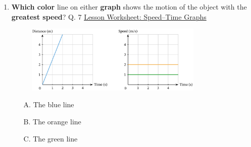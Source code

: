 \documentclass[A4,12pt]{article}
\begin{document}
\begin{enumerate}[label=\bfseries (\arabic*)]
\item \textbf{Which color} line on either \textbf{graph} shows the motion of the object with the \textbf{greatest speed}? \cite{Nagwa} Q. 7 \href{https://www.nagwa.com/en/worksheets/257191315239/}{Lesson Worksheet: Speed–Time Graphs}
%
\begin{figure}[H]
    \centering
    \includegraphics[width=0.8\textwidth]{Nagwa_Q7_Speedt.png}
\end{figure}
%
\begin{itemize}
    \item[A.] The blue line
    \item[B.] The orange line
    \item[C.] The green line
\end{itemize}
%















\end{enumerate}
\end{document}
